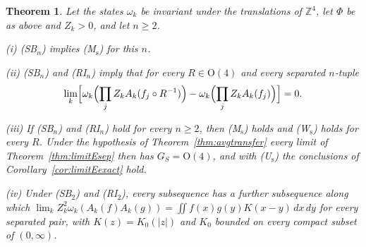 \documentclass[aps,prd,twocolumn,superscriptaddress,nofootinbib,longbibliography,floatfix,amsmath,amssymb,10pt]{revtex4-2}
\newtheorem{theorem}{Theorem}
\theoremstyle{definition}
\theoremstyle{remark}
\newcommand{\Z}{\mathbb{Z}}
\begin{document}
\begin{theorem}\label{thm:limitErot}
Let the states $\omega_k$ be invariant under the translations of $\Z^4$,
let $\Phi$ be as above and $Z_k>0$, and let $n\ge2$.

\textup{(i)} \textup{(SB$_n$)} implies \textup{(M$_{\mathrm s}$)} for this
$n$.

\textup{(ii)} \textup{(SB$_n$)} and \textup{(RI$_n$)} imply that for every
$R\in\mathrm O(4)$ and every separated $n$-tuple
\[
\lim_k\Bigl[\omega_k\Bigl(\prod_jZ_kA_k(f_j\circ R^{-1})\Bigr)-\omega_k
\Bigl(\prod_jZ_kA_k(f_j)\Bigr)\Bigr]=0 .
\]

\textup{(iii)} If \textup{(SB$_n$)} and \textup{(RI$_n$)} hold for every
$n\ge2$, then \textup{(M$_{\mathrm s}$)} holds and \textup{(W$_{\mathrm
s}$)} holds for every $R$. Under the hypothesis of
Theorem~\textup{\ref{thm:avgtransfer}} every limit of
Theorem~\textup{\ref{thm:limitEsep}} then has $G_S=\mathrm O(4)$, and with
\textup{(U$_{\mathrm s}$)} the conclusions of
Corollary~\textup{\ref{cor:limitEexact}} hold.

\textup{(iv)} Under \textup{(SB$_2$)} and \textup{(RI$_2$)}, every
subsequence has a further subsequence along which
$\lim_kZ_k^2\omega_k(A_k(f)A_k(g))=\iint f(x)g(y)K(x-y)\,dx\,dy$ for every
separated pair, with $K(z)=K_0(|z|)$ and $K_0$ bounded on every compact
subset of $(0,\infty)$.
\end{theorem}
\end{document}
